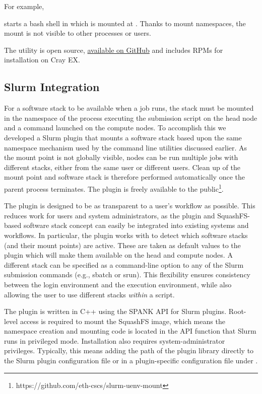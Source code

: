 For example,



starts a bash shell in which  is mounted at .
Thanks to mount namespaces, the mount is not visible to other processes or users.

The utility is open source, \href{https://github.com/eth-cscs/squashfs-mount}{available on GitHub} and includes RPMs for installation on Cray EX.

\subsection{Slurm Integration}

For a software stack to be available when a job runs, the stack must be mounted in the namespace of the process executing the submission script on the head node and a command launched on the compute nodes.
To accomplish this we developed a Slurm plugin that mounts a software stack based upon the same namespace mechanism used by the command line utilities discussed earlier.
As the mount point is not globally visible, nodes can be run multiple jobs with different stacks, either from the same user or different users.
Clean up of the mount point and software stack is therefore performed automatically once the parent process terminates.
The plugin is freely available to the public\footnote{https://github.com/eth-cscs/slurm-uenv-mount}.

The plugin is designed to be as transparent to a user's workflow as possible.
This reduces work for users and system administrators, as the plugin and SquashFS-based software stack concept can easily be integrated into existing systems and workflows.
In particular, the plugin works with  to detect which software stacks (and their mount points) are active.
These are taken as default values to the plugin which will make them available on the head and compute nodes.
A different stack can be specified as a command-line option to any of the Slurm submission commands (e.g., sbatch or srun).
This flexibility ensures consistency between the login environment and the execution environment, while also allowing the user to use different stacks \emph{within} a script.

The plugin is written in C++ using the SPANK API for Slurm plugins.
Root-level access is required to mount the SquashFS image, which means the namespace creation and mounting code is located in the API function that Slurm runs in privileged mode.
Installation also requires system-administrator privileges.
Typically, this means adding the path of the plugin library directly to the Slurm plugin configuration file  or in a plugin-specific configuration file under .

